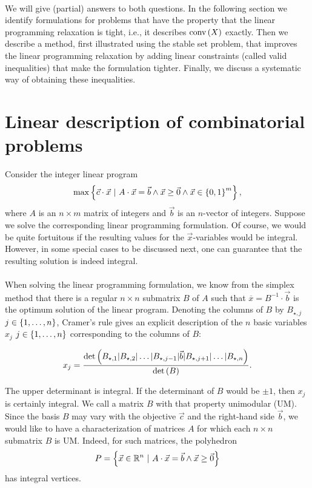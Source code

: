 {\paragraph{}
We will give (partial) answers to both questions. In the following section we identify formulations for problems that have the property that the linear programming relaxation is tight, i.e., it describes $\mbox{conv}\left( X \right)$ exactly. Then we describe a method, first illustrated using the stable set problem, that improves the linear programming relaxation by adding linear constraints (called valid inequalities) that make the formulation tighter. Finally, we discuss a systematic way of obtaining these inequalities.

\section{Linear description of combinatorial problems}
Consider the integer linear program
\begin{equation}
\max\left\{ \vec{c}\cdot\vec{x}\ |\ A\cdot\vec{x}=\vec{b}\wedge\vec{x}\geq\vec{0}\wedge\vec{x}\in\left\{ 0,1 \right\}^m \right\},
\end{equation}
where $A$ is an $n\times m$ matrix of integers and $\vec{b}$ is an $n$-vector of integers. Suppose we solve the corresponding linear programming formulation. Of course, we would be quite fortuitous if the resulting values for the $\vec{x}$-variables would be integral. However, in some special cases to be discussed next, one can guarantee that the resulting solution is indeed integral.

\paragraph{}
When solving the linear programming formulation, we know from the simplex method that there is a regular $n\times n$ submatrix $B$ of $A$ such that $\overline{x}=B^{-1}\cdot\vec{b}$ is the optimum solution of the linear program. Denoting the columns of $B$ by $B_{\star,j}$ $j\in\left\{ 1,\ldots,n \right\}$, Cramer's rule gives an explicit description of the $n$ basic variables $x_j$ $j\in\left\{ 1,\ldots,n \right\}$ corresponding to the columns of $B$:

\begin{equation}
x_j=\displaystyle\frac{\mbox{det}\left( B_{\star,1}|B_{\star,2}|\ldots|B_{\star,j-1}|\vec{b}|B_{\star,j+1}|\ldots|B_{\star,n} \right)}{\mbox{det}\left( B \right)}.
\end{equation}

The upper determinant is integral. If the determinant of $B$ would be $\pm 1$, then $x_j$ is certainly integral. We call a matrix $B$ with that property unimodular (UM). Since the basis $B$ may vary with the objective $\vec{c}$ and the right-hand side $\vec{b}$, we would like to have a characterization of matrices $A$ for which each $n\times n$ submatrix $B$ is UM. Indeed, for such matrices, the polyhedron
\begin{equation}
P=\left\{ \vec{x}\in\mathbb{R}^n\ |\ A\cdot\vec{x}=\vec{b}\wedge\vec{x}\geq\vec{0} \right\}
\end{equation}
has integral vertices.

}
